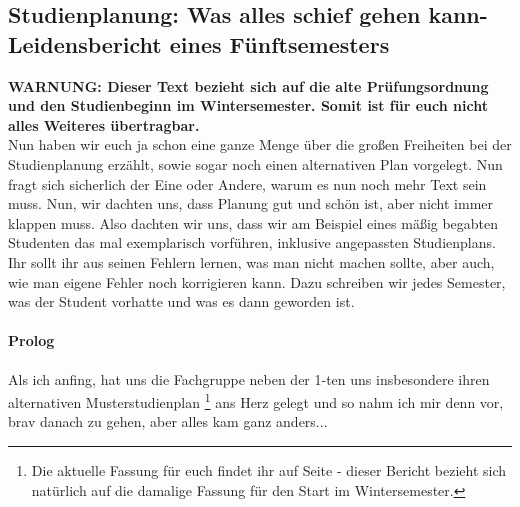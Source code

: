 \subsection{Studienplanung: Was alles schief gehen kann-
  Leidensbericht eines Fünftsemesters}
\label{studienplan_bericht}
  \textbf{WARNUNG: Dieser Text bezieht sich auf die alte
  Prüfungsordnung und den Studienbeginn im Wintersemester. Somit ist
  für euch nicht alles Weiteres übertragbar.}\\
Nun haben wir euch ja schon eine ganze Menge über die großen
Freiheiten bei der Studienplanung erzählt, sowie sogar noch einen
alternativen Plan vorgelegt. Nun fragt sich sicherlich der Eine oder
Andere, warum es nun noch mehr Text sein muss. Nun, wir dachten uns,
dass Planung gut und schön ist, aber nicht immer klappen muss. Also
dachten wir uns, dass wir am Beispiel eines mäßig begabten Studenten
das mal exemplarisch vorführen, inklusive angepassten
Studienplans. 
Ihr sollt ihr aus seinen Fehlern lernen, was man nicht machen sollte, aber
auch, wie man eigene Fehler noch korrigieren kann. Dazu schreiben wir
jedes Semester, was der Student vorhatte und was es dann geworden ist.
\paragraph{Prolog}
Als ich anfing, hat uns die Fachgruppe neben der 1-ten uns
insbesondere ihren alternativen Musterstudienplan
\footnote{Die aktuelle Fassung für euch findet ihr auf Seite \pageref{studienplan_neu} - dieser Bericht bezieht sich natürlich 
auf die damalige Fassung für den Start im Wintersemester.}
ans Herz gelegt und
so nahm ich mir denn vor, brav danach zu gehen, aber alles kam ganz
anders...
